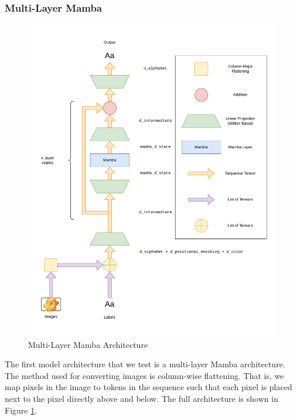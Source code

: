 \subsubsection{Multi-Layer Mamba}
\begin{figure}[ht]
    \includegraphics[width=\textwidth]{figures/sequence_stack.pdf}
    \caption{Multi-Layer Mamba Architecture}
    \label{sequencestack}
\end{figure}
The first model architecture that we test is a multi-layer Mamba architecture.
The method used for converting images is column-wise flattening. That is, we map
pixels in the image to tokens in the sequence such that each pixel is placed
next to the pixel directly above and below.
The full architecture is shown in Figure \ref{sequencestack}.

